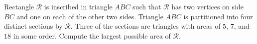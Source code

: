 Rectangle $\mathcal{R}$ is inscribed in triangle $ABC$ such that $\mathcal{R}$ has two vertices on side $BC$ and one on each of the other two sides. Triangle $ABC$ is partitioned into four distinct sections by $\mathcal{R}$. Three of the sections are triangles with areas of $5$, $7$, and $18$ in some order. Compute the largest possible area of $\mathcal{R}$.
